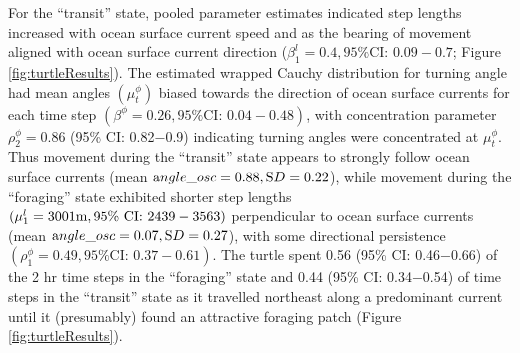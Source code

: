 \documentclass[12pt]{article}\usepackage[]{graphicx}\usepackage[]{color}
\begin{document}
For the ``transit'' state, pooled parameter estimates indicated step lengths increased with ocean surface current speed and as the bearing of movement aligned with ocean surface current direction ($\beta^l_1=0.4, \text{95\% CI: } 0.09-0.7$; Figure \ref{fig:turtleResults}). The estimated wrapped Cauchy distribution for turning angle had mean angles $(\mu^\phi_t)$ biased towards the direction of ocean surface currents for each time step $(\beta^\phi=0.26, \text{95\% CI: } 0.04-0.48)$, with concentration parameter $\rho^\phi_2=0.86$ (95\% CI: 0.82$-$0.9) indicating turning angles were concentrated at $\mu^\phi_t$. Thus movement during the ``transit'' state appears to strongly follow ocean surface currents (mean ${\text angle\_osc}=0.88,{\text SD}=0.22$), while movement during the ``foraging'' state exhibited shorter step lengths $(\mu^l_1=3001{\text m}, \text{95\% CI: } 2439-3563)$ perpendicular to ocean surface currents (mean ${\text angle\_osc}=0.07,{\text SD}=0.27$), with some directional persistence $(\rho^\phi_1=0.49, \text{95\% CI: } 0.37-0.61)$. The turtle spent 0.56 (95\% CI: 0.46$-$0.66) of the 2 hr time steps in the ``foraging'' state and 0.44 (95\% CI: 0.34$-$0.54) of time steps in the ``transit'' state as it travelled northeast along a predominant current until it (presumably) found an attractive foraging patch (Figure \ref{fig:turtleResults}).
\end{document}
